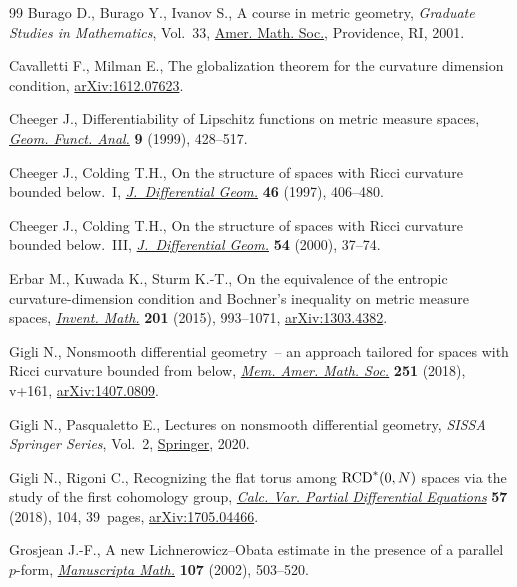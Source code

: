 \begin{thebibliography}{99}
Burago D., Burago Y., Ivanov S., A course in metric geometry, \textit{Graduate
 Studies in Mathematics}, Vol.~33, \href{https://doi.org/10.1090/gsm/033}{Amer. Math. Soc.}, Providence, RI, 2001.

Cavalletti F., Milman E., The globalization theorem for the curvature dimension
 condition, \href{https://arxiv.org/abs/1612.07623}{arXiv:1612.07623}.

Cheeger J., Differentiability of {L}ipschitz functions on metric measure
 spaces, \href{https://doi.org/10.1007/s000390050094}{\textit{Geom. Funct. Anal.}} \textbf{9} (1999), 428--517.

Cheeger J., Colding T.H., On the structure of spaces with {R}icci curvature
 bounded below.~{I}, \href{https://doi.org/10.4310/jdg/1214459974}{\textit{J.~Differential Geom.}} \textbf{46} (1997),
 406--480.

Cheeger J., Colding T.H., On the structure of spaces with {R}icci curvature
 bounded below.~{III}, \href{https://doi.org/10.4310/jdg/1214342146}{\textit{J.~Differential Geom.}} \textbf{54} (2000),
 37--74.

Erbar M., Kuwada K., Sturm K.-T., On the equivalence of the entropic
 curvature-dimension condition and {B}ochner's inequality on metric measure
 spaces, \href{https://doi.org/10.1007/s00222-014-0563-7}{\textit{Invent. Math.}} \textbf{201} (2015), 993--1071,
 \href{https://arxiv.org/abs/1303.4382}{arXiv:1303.4382}.

Gigli N., Nonsmooth differential geometry~-- an approach tailored for spaces
 with {R}icci curvature bounded from below, \href{https://doi.org/10.1090/memo/1196}{\textit{Mem. Amer. Math. Soc.}}
 \textbf{251} (2018), v+161, \href{https://arxiv.org/abs/1407.0809}{arXiv:1407.0809}.

Gigli N., Pasqualetto E., Lectures on nonsmooth differential geometry,
 \textit{SISSA Springer Series}, Vol.~2, \href{https://doi.org/10.1007/978-3-030-38613-9}{Springer}, 2020.

Gigli N., Rigoni C., Recognizing the flat torus among {${\rm RCD}^*(0,N)$}
 spaces via the study of the first cohomology group, \href{https://doi.org/10.1007/s00526-018-1377-z}{\textit{Calc. Var.
 Partial Differential Equations}} \textbf{57} (2018), 104, 39~pages,
 \href{https://arxiv.org/abs/1705.04466}{arXiv:1705.04466}.

Grosjean J.-F., A new {L}ichnerowicz--{O}bata estimate in the presence of a
 parallel {$p$}-form, \href{https://doi.org/10.1007/s002290200248}{\textit{Manuscripta Math.}} \textbf{107} (2002),
 503--520.


\end{thebibliography}
